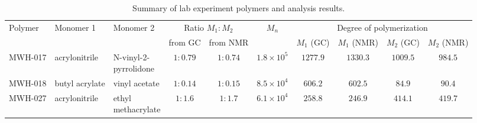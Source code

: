\begin{table}[t]
\centering
\scriptsize
\setlength{\tabcolsep}{2pt}
\renewcommand{\arraystretch}{1.1}
\begin{tabular}{@{} l l l cc c cccc @{} }
\toprule
Polymer & Monomer 1 & Monomer 2 & \multicolumn{2}{c}{Ratio $M_1\!:\!M_2$} & $M_n$ & \multicolumn{4}{c}{Degree of polymerization} \\
 &  &  & from GC & from NMR &  & $M_1$ (GC) & $M_1$ (NMR) & $M_2$ (GC) & $M_2$ (NMR) \\
\midrule
MWH-017 & acrylonitrile & \shortstack[l]{N-vinyl-2-\\pyrrolidone} & $1:0.79$ & $1:0.74$ & $1.8 \times 10^{5}$ & $1277.9$ & $1330.3$ & $1009.5$ & $984.5$ \\
MWH-018 & butyl acrylate & vinyl acetate & $1:0.14$ & $1:0.15$ & $8.5 \times 10^{4}$ & $606.2$ & $602.5$ & $84.9$ & $90.4$ \\
MWH-027 & acrylonitrile & \shortstack[l]{ethyl\\methacrylate} & $1:1.6$ & $1:1.7$ & $6.1 \times 10^{4}$ & $258.8$ & $246.9$ & $414.1$ & $419.7$ \\
\bottomrule
\end{tabular}
\caption{Summary of lab experiment polymers and analysis results.}
\label{tab:lab-experiments-summary}
\end{table}
